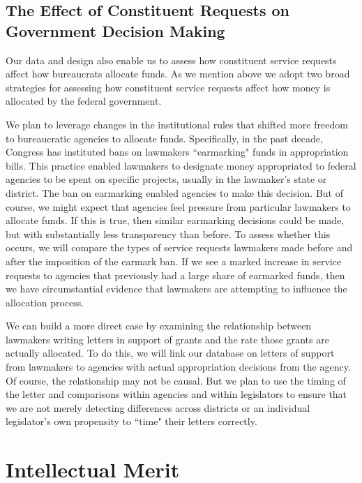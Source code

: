 \documentclass{article}
\begin{document}
\subsection{The Effect of Constituent Requests on Government Decision Making }
Our data and design also enable us to assess how constituent service requests affect how bureaucrats allocate funds.  As we mention above we adopt two broad strategies for assessing how constituent service requests affect how money is allocated by the federal government. 

We plan to leverage changes in the institutional rules that shifted more freedom to bureaucratic agencies to allocate funds.  Specifically, in the past decade, Congress has instituted bans on lawmakers ``earmarking" funds in appropriation bills. This practice enabled lawmakers to designate money appropriated to federal agencies to be spent on specific projects, usually in the lawmaker's state or district.  The ban on earmarking enabled agencies to make this decision.  But of course, we might expect that agencies feel pressure from particular lawmakers to allocate funds.  If this is true, then similar earmarking decisions could be made, but with substantially less transparency than before.  To assess whether this occurs, we will compare the types of service requests lawmakers made before and after the imposition of the earmark ban.  If we see a marked increase in service requests to agencies that previously had a large share of earmarked funds, then we have circumstantial evidence that lawmakers are attempting to influence the allocation process. 

We can build a more direct case by examining the relationship between lawmakers writing letters in support of grants and the rate those grants are actually allocated.  To do this, we will link our database on letters of support from lawmakers to agencies with actual appropriation decisions from the agency.  Of course, the relationship may not be causal.  But we plan to use the timing of the letter and comparisons within agencies and within legislators to ensure that we are not merely detecting differences across districts or an individual legislator's own propensity to ``time" their letters correctly. 

\section{Intellectual Merit}
\end{document}
